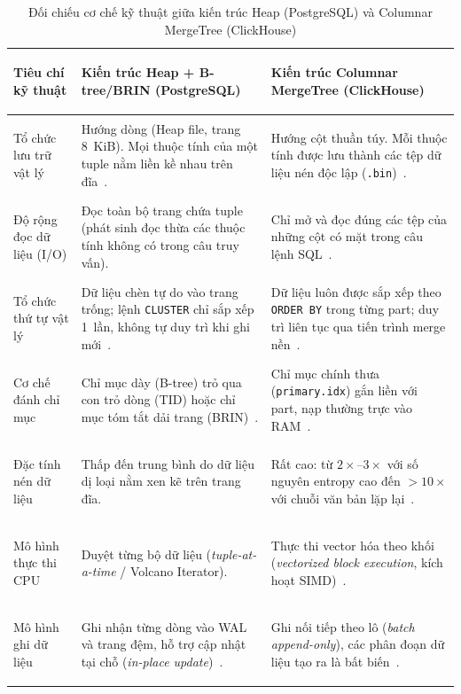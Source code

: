 \documentclass[13pt,a4paper]{report}
\begin{document}
\begin{table}[!htb]
\centering
\small
\renewcommand{\arraystretch}{1.15}
\caption{Đối chiếu cơ chế kỹ thuật giữa kiến trúc Heap (PostgreSQL) và Columnar MergeTree (ClickHouse)}
\label{tab:comparison_pg_ch}
\begin{tabularx}{\textwidth}{>{\bfseries\raggedright\arraybackslash}p{3.3cm} >{\raggedright\arraybackslash}X >{\raggedright\arraybackslash}X}
\toprule
\textbf{Tiêu chí kỹ thuật} & \textbf{Kiến trúc Heap + B-tree/BRIN (PostgreSQL)} & \textbf{Kiến trúc Columnar MergeTree (ClickHouse)} \\
\midrule
Tổ chức lưu trữ vật lý & Hướng dòng (Heap file, trang 8~KiB). Mọi thuộc tính của một tuple nằm liền kề nhau trên đĩa~\cite{P1}. & Hướng cột thuần túy. Mỗi thuộc tính được lưu thành các tệp dữ liệu nén độc lập (\texttt{.bin})~\cite{S2, S3}. \\
\addlinespace[4pt]
Độ rộng đọc dữ liệu (I/O) & Đọc toàn bộ trang chứa tuple (phát sinh đọc thừa các thuộc tính không có trong câu truy vấn). & Chỉ mở và đọc đúng các tệp của những cột có mặt trong câu lệnh SQL~\cite{A1, A2}. \\
\addlinespace[4pt]
Tổ chức thứ tự vật lý & Dữ liệu chèn tự do vào trang trống; lệnh \texttt{CLUSTER} chỉ sắp xếp 1~lần, không tự duy trì khi ghi mới~\cite{P5}. & Dữ liệu luôn được sắp xếp theo \texttt{ORDER BY} trong từng part; duy trì liên tục qua tiến trình merge nền~\cite{S2, S5}. \\
\addlinespace[4pt]
Cơ chế đánh chỉ mục & Chỉ mục dày (B-tree) trỏ qua con trỏ dòng (TID) hoặc chỉ mục tóm tắt dải trang (BRIN)~\cite{P2, P3}. & Chỉ mục chính thưa (\texttt{primary.idx}) gắn liền với part, nạp thường trực vào RAM~\cite{S4}. \\
\addlinespace[4pt]
Đặc tính nén dữ liệu & Thấp đến trung bình do dữ liệu dị loại nằm xen kẽ trên trang đĩa. & Rất cao: từ $2{\times}\text{--}3{\times}$ với số nguyên entropy cao đến $> 10{\times}$ với chuỗi văn bản lặp lại~\cite{A1}. \\
\addlinespace[4pt]
Mô hình thực thi CPU & Duyệt từng bộ dữ liệu (\textit{tuple-at-a-time} / Volcano Iterator). & Thực thi vector hóa theo khối (\textit{vectorized block execution}, kích hoạt SIMD)~\cite{A1, A2}. \\
\addlinespace[4pt]
Mô hình ghi dữ liệu & Ghi nhận từng dòng vào WAL và trang đệm, hỗ trợ cập nhật tại chỗ (\textit{in-place update})~\cite{P8}. & Ghi nối tiếp theo lô (\textit{batch append-only}), các phân đoạn dữ liệu tạo ra là bất biến~\cite{S3, S9}. \\
\bottomrule
\end{tabularx}
\end{table}
\end{document}
